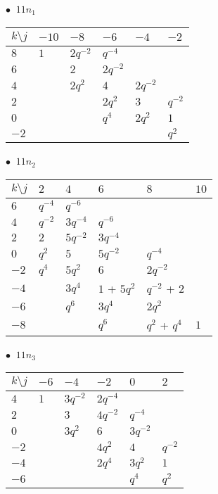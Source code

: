 %
\begin{minipage}{\linewidth}
$\bullet\ $ $11n_{1}$ \vspace{0.5em} \\
\begin{tabular}{l|lllll}
$k \setminus j$ & $-10$ & $-8$ & $-6$ & $-4$ & $-2$ \\
\hline
$8$ & $1$ & $2q^{-2}$ & $q^{-4}$ &  &  \\
$6$ &  & $2$ & $2q^{-2}$ &  &  \\
$4$ &  & $2q^{2}$ & $4$ & $2q^{-2}$ &  \\
$2$ &  &  & $2q^{2}$ & $3$ & $q^{-2}$ \\
$0$ &  &  & $q^{4}$ & $2q^{2}$ & $1$ \\
$-2$ &  &  &  &  & $q^{2}$ \\
\end{tabular}
\vspace{2em}
\end{minipage}
%
\begin{minipage}{\linewidth}
$\bullet\ $ $11n_{2}$ \vspace{0.5em} \\
\begin{tabular}{l|lllll}
$k \setminus j$ & $2$ & $4$ & $6$ & $8$ & $10$ \\
\hline
$6$ & $q^{-4}$ & $q^{-6}$ &  &  &  \\
$4$ & $q^{-2}$ & $3q^{-4}$ & $q^{-6}$ &  &  \\
$2$ & $2$ & $5q^{-2}$ & $3q^{-4}$ &  &  \\
$0$ & $q^{2}$ & $5$ & $5q^{-2}$ & $q^{-4}$ &  \\
$-2$ & $q^{4}$ & $5q^{2}$ & $6$ & $2q^{-2}$ &  \\
$-4$ &  & $3q^{4}$ & $1$ + $5q^{2}$ & $q^{-2}$ + $2$ &  \\
$-6$ &  & $q^{6}$ & $3q^{4}$ & $2q^{2}$ &  \\
$-8$ &  &  & $q^{6}$ & $q^{2}$ + $q^{4}$ & $1$ \\
\end{tabular}
\vspace{2em}
\end{minipage}
%
\begin{minipage}{\linewidth}
$\bullet\ $ $11n_{3}$ \vspace{0.5em} \\
\begin{tabular}{l|lllll}
$k \setminus j$ & $-6$ & $-4$ & $-2$ & $0$ & $2$ \\
\hline
$4$ & $1$ & $3q^{-2}$ & $2q^{-4}$ &  &  \\
$2$ &  & $3$ & $4q^{-2}$ & $q^{-4}$ &  \\
$0$ &  & $3q^{2}$ & $6$ & $3q^{-2}$ &  \\
$-2$ &  &  & $4q^{2}$ & $4$ & $q^{-2}$ \\
$-4$ &  &  & $2q^{4}$ & $3q^{2}$ & $1$ \\
$-6$ &  &  &  & $q^{4}$ & $q^{2}$ \\
\end{tabular}
\vspace{2em}
\end{minipage}
